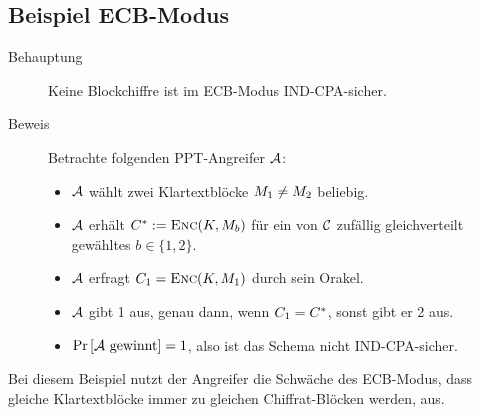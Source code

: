 \subsection{Beispiel ECB-Modus}
\begin{description}
\item[Behauptung] Keine Blockchiffre ist im ECB-Modus\indexECB
  IND-CPA-sicher.
\item[Beweis] Betrachte folgenden PPT-Angreifer $\mathcal{A}$:
  \begin{itemize}
  \item $\mathcal{A}$ wählt zwei Klartextblöcke $M_1 \neq
    M_2$ beliebig.
  \item $\mathcal{A}$ erhält $C^{*} := \textsc{Enc}(K,
    M_{b})$ für ein von $\mathcal{C}$ zufällig gleichverteilt gewähltes $b \in
    \{1, 2\}$.
  \item $\mathcal{A}$ erfragt $C_1 = \textsc{Enc}(K, M_1)$
    durch sein Orakel.
  \item $\mathcal{A}$ gibt 1 aus, genau dann, wenn $C_1 =
    C^{*}$, sonst gibt er 2 aus.
  \item $\Pr \left[ \mathcal{A} \text{ gewinnt} \right] = 1$, also
    ist das Schema nicht IND-CPA-sicher.
  \end{itemize}
\end{description} Bei diesem Beispiel nutzt der Angreifer die Schwäche
des ECB-Modus, dass gleiche Klartextblöcke immer zu gleichen
Chiffrat-Blöcken werden, aus.

